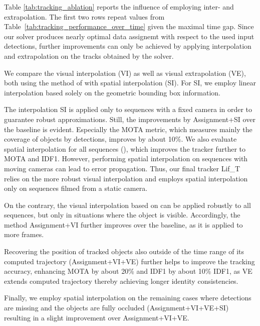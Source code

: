 \documentclass{article}
\begin{document}
Table \ref{tab:tracking_ablation} reports the influence of employing inter- and extrapolation.
The first two rows repeat values from Table~\ref{tab:tracking_performance_over_time} given the maximal  time gap. Since our solver produces nearly optimal data assignemt with respect to the used input detections, further improvements can only be achieved by applying interpolation and extrapolation on the tracks obtained by the solver.

We compare the visual interpolation (VI) as well as visual extrapolation (VE), both using the method of \cite{bergmann2019tracking} with spatial interpolation (SI). For SI, we employ linear interpolation based solely on the geometric bounding box information. 

The interpolation SI is applied only to sequences with a fixed camera in order to guarantee robust approximations.
Still, the improvements by Assignment+SI over the baseline is evident. Especially the MOTA metric, which measures mainly the coverage of objects by detections, improves by about 10\%. We also evaluate spatial interpolation for all sequences (), which improves the tracker further to  MOTA and  IDF1. However, performing spatial interpolation on sequences with moving cameras can lead to error propagation. Thus, our final tracker Lif\_T relies on the more robust visual interpolation and employs spatial interpolation only on sequences filmed from a static camera.

On the contrary, the  visual interpolation based on \cite{bergmann2019tracking} can be applied robustly to all sequences, but only in situations where the object is visible.
Accordingly, the method Assignment+VI further improves over the baseline, as it is applied to more frames.

Recovering the position of tracked objects also outside of the time range of its computed trajectory (Assignment+VI+VE) further helps to improve the tracking accuracy, enhancing MOTA by about 20\% and IDF1 by about 10\% IDF1, as VE extends computed trajectory thereby achieving longer identity consistencies.

Finally, we employ spatial interpolation on the remaining cases where detections are missing and the objects are fully occluded (Assignment+VI+VE+SI) resulting in a slight improvement over Assignment+VI+VE.
\end{document}
